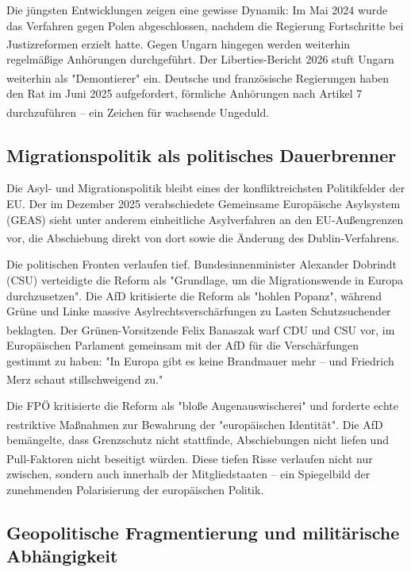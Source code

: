 \documentclass[12pt,a4paper]{article}
\newcommand{\footcite}[1]{\textsuperscript{\cite{#1}}}
\begin{document}
	Die jüngsten Entwicklungen zeigen eine gewisse Dynamik: Im Mai 2024 wurde das Verfahren gegen Polen abgeschlossen, nachdem die Regierung Fortschritte bei Justizreformen erzielt hatte.\footcite{Council2025} Gegen Ungarn hingegen werden weiterhin regelmäßige Anhörungen durchgeführt. Der Liberties-Bericht 2026 stuft Ungarn weiterhin als "Demontierer" ein.\footcite{Liberties2026} Deutsche und französische Regierungen haben den Rat im Juni 2025 aufgefordert, förmliche Anhörungen nach Artikel 7 durchzuführen – ein Zeichen für wachsende Ungeduld.\footcite{Folk2025}
	
	\subsection{Migrationspolitik als politisches Dauerbrenner}
	
	Die Asyl- und Migrationspolitik bleibt eines der konfliktreichsten Politikfelder der EU. Der im Dezember 2025 verabschiedete Gemeinsame Europäische Asylsystem (GEAS) sieht unter anderem einheitliche Asylverfahren an den EU-Außengrenzen vor, die Abschiebung direkt von dort sowie die Änderung des Dublin-Verfahrens.\footcite{Bundestag2025}
	
	Die politischen Fronten verlaufen tief. Bundesinnenminister Alexander Dobrindt (CSU) verteidigte die Reform als "Grundlage, um die Migrationswende in Europa durchzusetzen". Die AfD kritisierte die Reform als "hohlen Popanz", während Grüne und Linke massive Asylrechtsverschärfungen zu Lasten Schutzsuchender beklagten.\footcite{Bundestag2025} Der Grünen-Vorsitzende Felix Banaszak warf CDU und CSU vor, im Europäischen Parlament gemeinsam mit der AfD für die Verschärfungen gestimmt zu haben: "In Europa gibt es keine Brandmauer mehr – und Friedrich Merz schaut stillschweigend zu."\footcite{Banaszak2025}
	
	Die FPÖ kritisierte die Reform als "bloße Augenauswischerei" und forderte echte restriktive Maßnahmen zur Bewahrung der "europäischen Identität".\footcite{FPÖ2025} Die AfD bemängelte, dass Grenzschutz nicht stattfinde, Abschiebungen nicht liefen und Pull-Faktoren nicht beseitigt würden.\footcite{Curio2025} Diese tiefen Risse verlaufen nicht nur zwischen, sondern auch innerhalb der Mitgliedstaaten – ein Spiegelbild der zunehmenden Polarisierung der europäischen Politik.
	
	\subsection{Geopolitische Fragmentierung und militärische Abhängigkeit}
	
\end{document}
